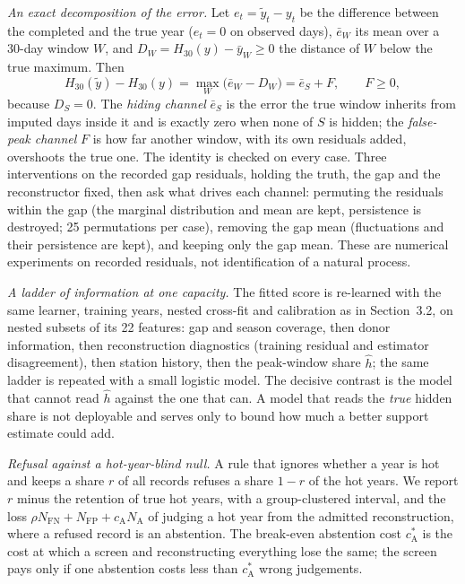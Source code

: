 \documentclass[draft]{agujournal2025}
\begin{document}
\emph{An exact decomposition of the error.} Let $e_t=\tilde y_t-y_t$ be the
difference between the completed and the true year ($e_t=0$ on observed days),
$\bar e_W$ its mean over a 30-day window $W$, and $D_W=H_{30}(y)-\bar y_W\ge0$ the
distance of $W$ below the true maximum. Then
\begin{equation}
H_{30}(\tilde y)-H_{30}(y)=\max_W\bigl(\bar e_W-D_W\bigr)=\bar e_S+F,
\qquad F\ge 0,
\label{eq:identity}
\end{equation}
because $D_S=0$. The \emph{hiding channel} $\bar e_S$ is the error the true
window inherits from imputed days inside it and is exactly zero when none of $S$
is hidden; the \emph{false-peak channel} $F$ is how far another window, with its
own residuals added, overshoots the true one. The identity is checked on every
case. Three interventions on the recorded gap residuals, holding the truth, the
gap and the reconstructor fixed, then ask what drives each channel: permuting the
residuals within the gap (the marginal distribution and mean are kept, persistence
is destroyed; 25 permutations per case), removing the gap mean (fluctuations and
their persistence are kept), and keeping only the gap mean. These are numerical
experiments on recorded residuals, not identification of a natural process.

\emph{A ladder of information at one capacity.} The fitted score is re-learned
with the same learner, training years, nested cross-fit and calibration as in
Section~3.2, on nested subsets of its 22 features: gap and season coverage, then
donor information, then reconstruction diagnostics (training residual and
estimator disagreement), then station history, then the peak-window share
$\hat h$; the same ladder is repeated with a small logistic model. The decisive
contrast is the model that cannot read $\hat h$ against the one that can. A model
that reads the \emph{true} hidden share is not deployable and serves only to
bound how much a better support estimate could add.

\emph{Refusal against a hot-year-blind null.} A rule that ignores whether a year
is hot and keeps a share $r$ of all records refuses a share $1-r$ of the hot
years. We report $r$ minus the retention of true hot years, with a group-clustered
interval, and the loss $\rho N_{\mathrm{FN}}+N_{\mathrm{FP}}+c_{\mathrm{A}}N_{\mathrm{A}}$
of judging a hot year from the admitted reconstruction, where a refused record is
an abstention. The break-even abstention cost $c_{\mathrm{A}}^{\ast}$ is the cost
at which a screen and reconstructing everything lose the same; the screen pays
only if one abstention costs less than $c_{\mathrm{A}}^{\ast}$ wrong judgements.
\end{document}
